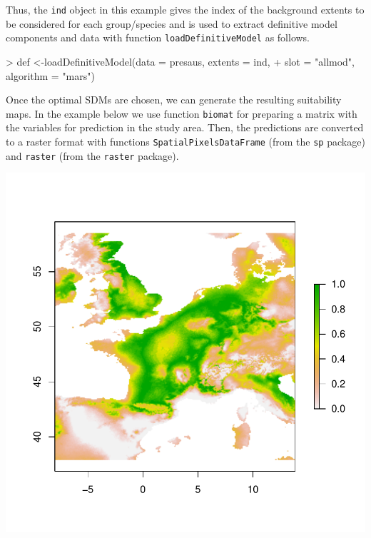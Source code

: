 \documentclass[10pt,a4paper]{report}
\begin{document}
Thus, the \texttt{ind} object in this example gives the index of the background extents to be considered for each group/species and is used to extract definitive model components and data with function \texttt{loadDefinitiveModel} as follows. 

\begin{Schunk}
\begin{Sinput}
> def <-loadDefinitiveModel(data = presaus, extents = ind, 
+                      slot = "allmod", algorithm = "mars")
\end{Sinput}
\end{Schunk}

Once the optimal SDMs are chosen, we can generate the resulting suitability maps. In the example below we use function \texttt{biomat} for preparing a matrix with the variables for prediction in the study area. Then, the predictions are converted to a raster format with functions \texttt{SpatialPixelsDataFrame} (from the \texttt{sp} package) and \texttt{raster} (from the \texttt{raster} package).

\begin{Schunk}
\end{Schunk}
\includegraphics{mopa-mopa16}





\end{document}
